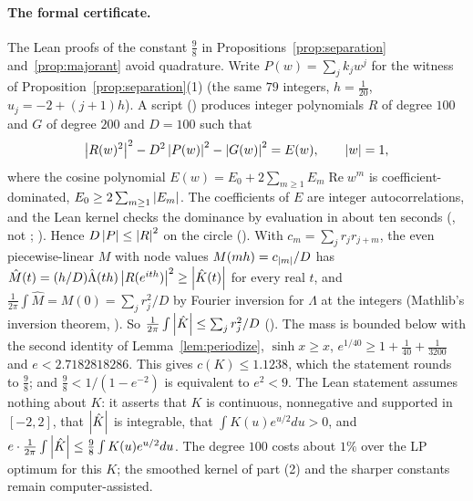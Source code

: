\paragraph{The formal certificate.}
The Lean proofs of the constant $\frac98$ in Propositions~\ref{prop:separation} and~\ref{prop:majorant} avoid quadrature. Write
$P(w)=\sum_jk_jw^j$ for the witness of Proposition~\ref{prop:separation}(1) (the same $79$ integers, $h=\frac1{20}$, $u_j=-2+(j+1)h$). A script
() produces integer polynomials $R$ of degree $100$ and $G$ of degree $200$ and $D=100$ such that
\[
  \left\lvert R(w)^2 \right\rvert^2-D^2\left\lvert P(w) \right\rvert^2-\left\lvert G(w) \right\rvert^2=E(w),\qquad \left\lvert w \right\rvert=1,
\]
where the cosine polynomial $E(w)=E_0+2\sum_{m\ge1}E_m\operatorname{Re}w^m$ is coefficient-dominated, $E_0\ge2\sum_{m\ge1}\left\lvert E_m \right\rvert$. The coefficients of
$E$ are integer autocorrelations, and the Lean kernel checks the dominance by evaluation in about ten seconds (, not
; ). Hence $D\left\lvert P \right\rvert\le\left\lvert R \right\rvert^2$ on the circle (). With $c_m=\sum_jr_jr_{j+m}$, the even
piecewise-linear $M$ with node values $M(mh)=c_{\left\lvert m \right\rvert}/D$ has $\hat M(t)=(h/D)\hat\Lambda(th)\left\lvert R(e^{ith}) \right\rvert^2\ge\left\lvert \hat K(t) \right\rvert$ for every real
$t$, and $\frac1{2\pi}\int\hat M=M(0)=\sum_jr_j^2/D$ by Fourier inversion for $\Lambda$ at the integers (Mathlib's inversion theorem,
). So $\frac1{2\pi}\int\left\lvert \hat K \right\rvert\le\sum_jr_j^2/D$ (). The mass is bounded
below with the second identity of Lemma~\ref{lem:periodize}, $\sinh x\ge x$, $e^{1/40}\ge1+\frac1{40}+\frac1{3200}$ and $e<2.7182818286$. This gives
$c(K)\le1.1238$, which the statement rounds to $\frac98$; and $\frac98<1/(1-e^{-2})$ is equivalent to $e^2<9$. The Lean statement assumes nothing about
$K$: it asserts that $K$ is continuous, nonnegative and supported in $[-2,2]$, that $\left\lvert \hat K \right\rvert$ is integrable, that $\int K(u)e^{u/2}du>0$, and
$e\cdot\frac1{2\pi}\int\left\lvert \hat K \right\rvert\le\frac98\int K(u)e^{u/2}du$. The degree $100$ costs about $1\%$ over the LP optimum for this $K$; the smoothed kernel of
part (2) and the sharper constants remain computer-assisted.

